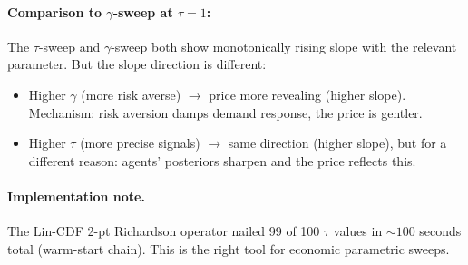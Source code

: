 \documentclass[11pt]{article}
\begin{document}
\paragraph{Comparison to $\gamma$-sweep at $\tau=1$:}
The $\tau$-sweep and $\gamma$-sweep both show monotonically rising slope
with the relevant parameter. But the slope direction is different:
\begin{itemize}
  \item Higher $\gamma$ (more risk averse) $\rightarrow$ price more revealing
        (higher slope). Mechanism: risk aversion damps demand response,
        the price is gentler.
  \item Higher $\tau$ (more precise signals) $\rightarrow$ same direction
        (higher slope), but for a different reason: agents' posteriors
        sharpen and the price reflects this.
\end{itemize}

\paragraph{Implementation note.} The Lin-CDF 2-pt Richardson operator
nailed 99 of 100 $\tau$ values in $\sim 100$ seconds total (warm-start
chain). This is the right tool for economic parametric sweeps.
\end{document}
